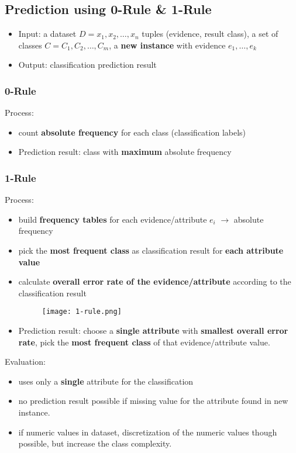 \subsection{Prediction using 0-Rule \& 1-Rule}
\begin{itemize}
	\item Input: a dataset $D = x_1, x_2, \dots, x_n$ tuples (evidence, result class), a set of classes $C = C_1, C_2, \dots , C_m$, a \textbf{new instance} with evidence $e_1, \dots, e_k$
	\item Output: classification prediction result 
\end{itemize}
\subsubsection{0-Rule}
Process:
\begin{itemize}
	\item count \textbf{absolute frequency} for each class (classification labels)
	\item Prediction result: class with \textbf{maximum} absolute frequency
\end{itemize}
\subsubsection{1-Rule}
Process:
\begin{itemize}
	\item build \textbf{frequency tables} for each evidence/attribute $e_i$ $\rightarrow$ absolute frequency
	\item pick the \textbf{most frequent class} as classification result for \textbf{each attribute value}
	\item calculate \textbf{overall error rate of the evidence/attribute} according to the classification result
	\begin{figure}[H]
		\centering
		\texttt{[image: 1-rule.png]}
	\end{figure}
	\item Prediction result: choose a \textbf{single attribute} with \textbf{smallest overall error rate}, pick the \textbf{most frequent class} of that evidence/attribute value.
\end{itemize}
Evaluation:
\begin{itemize}
	\item uses only a \textbf{single} attribute for the classification
	\item no prediction result possible if missing value for the attribute found in new instance.
	\item if numeric values in dataset, discretization of the numeric values though possible, but increase the class complexity.
\end{itemize}


